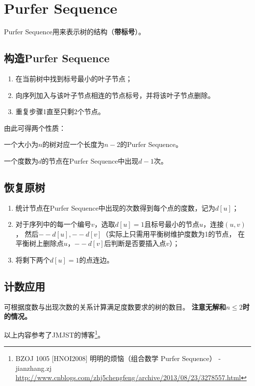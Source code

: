 \section{Purfer Sequence}\label{PurferSeq}
Purfer Sequence用来表示树的结构（{\bfseries 带标号}）。
\subsection{构造Purfer Sequence}
\begin{enumerate}
	\item 在当前树中找到标号最小的叶子节点；
	\item 向序列加入与该叶子节点相连的节点标号，并将该叶子节点删除。
	\item 重复步骤1直至只剩2个节点。
\end{enumerate}
由此可得两个性质：
\begin{property}[唯一性]
	一个大小为$n$的树对应一个长度为$n-2$的Purfer Sequence。
\end{property}
\begin{property}
	一个度数为$d$的节点在Purfer Sequence中出现$d-1$次。
\end{property}
\subsection{恢复原树}
\begin{enumerate}
	\item 统计节点在Purfer Sequence中出现的次数得到每个点的度数，记为$d[u]$；
	\item 对于序列中的每一个编号$v$，选取$d[u]=1$且标号最小的节点$u$，连接$(u,v)$，
		  然后$--d[u],--d[v]$（实际上只需用平衡树维护度数为1的节点，
		  在平衡树上删除点$u$，$--d[v]$后判断是否要插入点$v$）；
	\item 将剩下两个$d[u]=1$的点连边。
\end{enumerate}
\subsection{计数应用}
可根据度数与出现次数的关系计算满足度数要求的树的数目。
{\bfseries 注意无解和$n\leq 2$时的情况。}

以上内容参考了JMJST的博客\footnote{
	BZOJ 1005 [HNOI2008] 明明的烦恼（组合数学 Purfer Sequence） - jianzhang.zj
	\url{http://www.cnblogs.com/zhj5chengfeng/archive/2013/08/23/3278557.html}
}。
